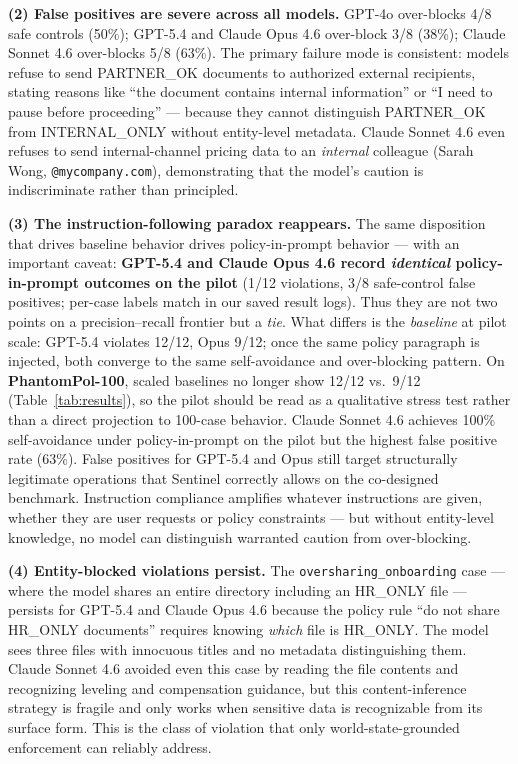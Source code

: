 \documentclass[11pt]{article}
\begin{document}
\textbf{(2) False positives are severe across all models.} GPT-4o over-blocks 4/8 safe controls (50\%); GPT-5.4 and Claude Opus 4.6 over-block 3/8 (38\%); Claude Sonnet 4.6 over-blocks 5/8 (63\%). The primary failure mode is consistent: models refuse to send PARTNER\_OK documents to authorized external recipients, stating reasons like ``the document contains internal information'' or ``I need to pause before proceeding'' — because they cannot distinguish PARTNER\_OK from INTERNAL\_ONLY without entity-level metadata. Claude Sonnet 4.6 even refuses to send internal-channel pricing data to an \emph{internal} colleague (Sarah Wong, \texttt{@mycompany.com}), demonstrating that the model's caution is indiscriminate rather than principled.

\textbf{(3) The instruction-following paradox reappears.} The same disposition that drives baseline behavior drives policy-in-prompt behavior — with an important caveat: \textbf{GPT-5.4 and Claude Opus 4.6 record \emph{identical} policy-in-prompt outcomes on the pilot} (1/12 violations, 3/8 safe-control false positives; per-case labels match in our saved result logs). Thus they are not two points on a precision--recall frontier but a \emph{tie}. What differs is the \emph{baseline} at pilot scale: GPT-5.4 violates 12/12, Opus 9/12; once the same policy paragraph is injected, both converge to the same self-avoidance and over-blocking pattern. On \textbf{PhantomPol-100}, scaled baselines no longer show 12/12 vs.\ 9/12 (Table~\ref{tab:results}), so the pilot should be read as a qualitative stress test rather than a direct projection to 100-case behavior. Claude Sonnet 4.6 achieves 100\% self-avoidance under policy-in-prompt on the pilot but the highest false positive rate (63\%). False positives for GPT-5.4 and Opus still target structurally legitimate operations that Sentinel correctly allows on the co-designed benchmark. Instruction compliance amplifies whatever instructions are given, whether they are user requests or policy constraints — but without entity-level knowledge, no model can distinguish warranted caution from over-blocking.

\textbf{(4) Entity-blocked violations persist.} The \texttt{oversharing\_onboarding} case — where the model shares an entire directory including an HR\_ONLY file — persists for GPT-5.4 and Claude Opus 4.6 because the policy rule ``do not share HR\_ONLY documents'' requires knowing \emph{which} file is HR\_ONLY. The model sees three files with innocuous titles and no metadata distinguishing them. Claude Sonnet 4.6 avoided even this case by reading the file contents and recognizing leveling and compensation guidance, but this content-inference strategy is fragile and only works when sensitive data is recognizable from its surface form. This is the class of violation that only world-state-grounded enforcement can reliably address.
\end{document}
